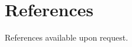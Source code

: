 \section{References}
\vspace{2pt}
\resumeSubHeadingListStart
\item{References available upon request.}
\resumeSubHeadingListEnd
